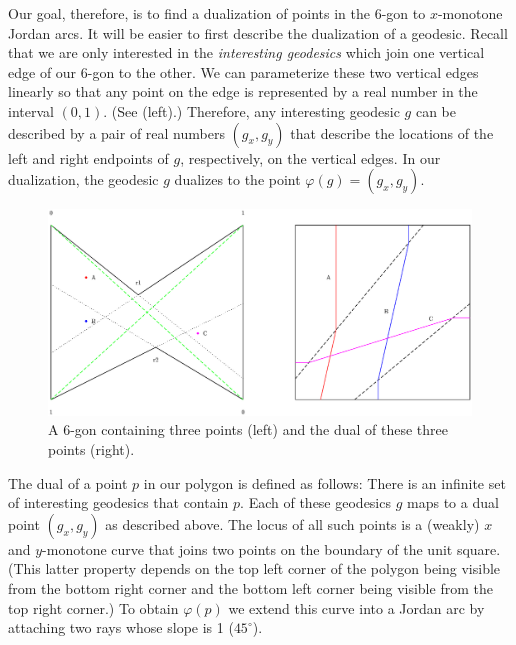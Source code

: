 \documentclass[charterfonts,lotsofwhite]{patmorin}
\newcommand{\dual}[1]{\varphi(#1)}
\begin{document}
Our goal, therefore, is to find a dualization of points in the 6-gon
to $x$-monotone Jordan arcs.  It will be easier to first describe the
dualization of a geodesic.  Recall that we are only interested in the
\emph{interesting geodesics} which join one vertical edge of our 6-gon
to the other.  We can parameterize these two vertical edges linearly
so that any point on the edge is represented by a real number in the
interval $(0,1)$.  (See  (left).)  Therefore, any
interesting geodesic $g$ can be described by a pair of real numbers
$(g_x,g_y)$ that describe the locations of the left and right
endpoints of $g$, respectively, on the vertical edges.  In our
dualization, the geodesic $g$ dualizes to the point
$\dual{g}=(g_x,g_y)$.

\begin{figure}[htbp]
\begin{center}\includegraphics[scale=0.6]{dual}\end{center}
\caption{A 6-gon containing three points (left) and the dual of these
three points (right).}
\end{figure}

The dual of a point $p$ in our polygon is defined as follows:  There
is an infinite set of interesting geodesics that contain $p$.  Each of
these geodesics $g$ maps to a dual point $(g_x,g_y)$ as described
above.  The locus of all such points is a (weakly) $x$ and
$y$-monotone curve that joins two points on the boundary of the unit
square. (This latter property depends on the top left corner of the
polygon being visible from the bottom right corner and the bottom left
corner being visible from the top right corner.)  To obtain $\dual{p}$
we extend this curve into a Jordan arc by attaching two rays whose
slope is 1 ($45^\circ$).
\end{document}
